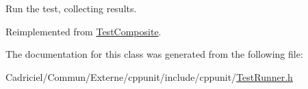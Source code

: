 Run the test, collecting results. 



Reimplemented from \hyperlink{class_test_composite_a2ba14045b1a1e83963dd4db746b04dfd}{Test\-Composite}.



The documentation for this class was generated from the following file\-:\begin{DoxyCompactItemize}
\item 
Cadriciel/\-Commun/\-Externe/cppunit/include/cppunit/\hyperlink{_test_runner_8h}{Test\-Runner.\-h}\end{DoxyCompactItemize}
